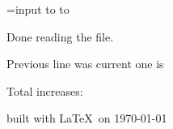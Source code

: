 \documentclass{article}
\begin{document}
\setcounter{mycounter}{0}

\newread\file
\openin\file=input
\read\file to\prevline
\loop
    \read\file to \fileline

    \ifeof\file
      Done reading the file.
    \else

    Previous line was \prevline current one is \fileline
    \edef\prevline{\fileline}
\repeat
\closein\file

\hrulefill

Total increases: 

built with \LaTeX \ on \today
\end{document}
